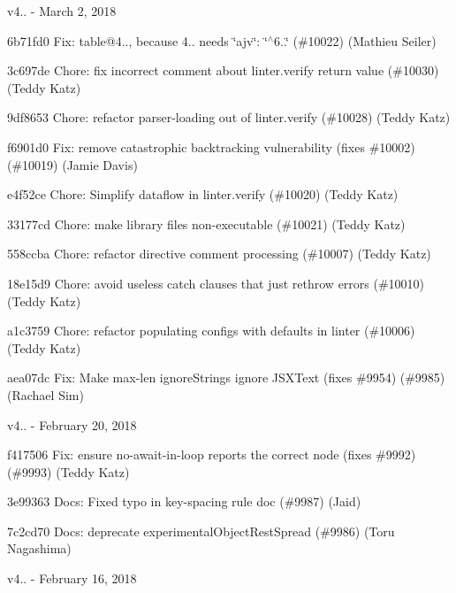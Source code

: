 v4.. -\/ March 2, 2018


\begin{DoxyItemize}
\item 6b71fd0 Fix\+: table@4.., because 4.. needs \char`\"{}ajv\char`\"{}\+: \char`\"{}$^\wedge$6..\char`\"{} (\#10022) (Mathieu Seiler)
\item 3c697de Chore\+: fix incorrect comment about linter.\+verify return value (\#10030) (Teddy Katz)
\item 9df8653 Chore\+: refactor parser-\/loading out of linter.\+verify (\#10028) (Teddy Katz)
\item f6901d0 Fix\+: remove catastrophic backtracking vulnerability (fixes \#10002) (\#10019) (Jamie Davis)
\item e4f52ce Chore\+: Simplify dataflow in linter.\+verify (\#10020) (Teddy Katz)
\item 33177cd Chore\+: make library files non-\/executable (\#10021) (Teddy Katz)
\item 558ccba Chore\+: refactor directive comment processing (\#10007) (Teddy Katz)
\item 18e15d9 Chore\+: avoid useless catch clauses that just rethrow errors (\#10010) (Teddy Katz)
\item a1c3759 Chore\+: refactor populating configs with defaults in linter (\#10006) (Teddy Katz)
\item aea07dc Fix\+: Make max-\/len ignore\+Strings ignore J\+S\+X\+Text (fixes \#9954) (\#9985) (Rachael Sim)
\end{DoxyItemize}

v4.. -\/ February 20, 2018


\begin{DoxyItemize}
\item f417506 Fix\+: ensure no-\/await-\/in-\/loop reports the correct node (fixes \#9992) (\#9993) (Teddy Katz)
\item 3e99363 Docs\+: Fixed typo in key-\/spacing rule doc (\#9987) (Jaid)
\item 7c2cd70 Docs\+: deprecate experimental\+Object\+Rest\+Spread (\#9986) (Toru Nagashima)
\end{DoxyItemize}

v4.. -\/ February 16, 2018


